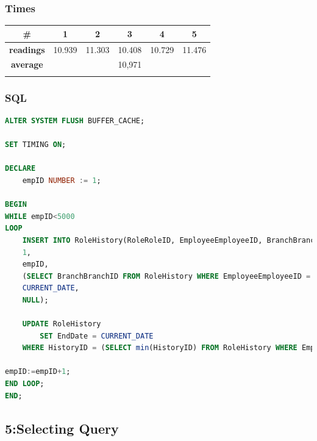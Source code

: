 \documentclass[a4paper, 10pt]{article}
\begin{document}
\subsubsection{Times}
\begin{table}[H]
\centering
\begin{tabular}{cccccc}
\hline
\multicolumn{1}{|c|}{\textbf{\#}}       & \multicolumn{1}{c|}{\textbf{1}} & \multicolumn{1}{c|}{\textbf{2}} & \multicolumn{1}{c|}{\textbf{3}} & \multicolumn{1}{c|}{\textbf{4}} & \multicolumn{1}{c|}{\textbf{5}} \\ \hline
\multicolumn{1}{|c|}{\textbf{readings}} & \multicolumn{1}{c|}{10.939}           & \multicolumn{1}{c|}{11.303}           & \multicolumn{1}{c|}{10.408}           & \multicolumn{1}{c|}{10.729}           & \multicolumn{1}{c|}{11.476}           \\ \hline
\multicolumn{1}{|c|}{\textbf{average}}      & \multicolumn{5}{c|}{10,971}                                                                                                                                                   \\ \hline
\textbf{}                               & \textbf{}                       & \textbf{}                       & \textbf{}                       & \textbf{}                       & \textbf{}                      
\end{tabular}
\end{table}
\subsubsection{SQL}
\begin{lstlisting}[language=SQL]
ALTER SYSTEM FLUSH BUFFER_CACHE;

SET TIMING ON;

DECLARE 
    empID NUMBER := 1;

BEGIN
WHILE empID<5000
LOOP
    INSERT INTO RoleHistory(RoleRoleID, EmployeeEmployeeID, BranchBranchId, BeginDate, EndDate) VALUES (
    1,
    empID,
    (SELECT BranchBranchID FROM RoleHistory WHERE EmployeeEmployeeID = empID AND EndDate is NULL),
    CURRENT_DATE,
    NULL);

    UPDATE RoleHistory
        SET EndDate = CURRENT_DATE
    WHERE HistoryID = (SELECT min(HistoryID) FROM RoleHistory WHERE EmployeeEmployeeID = empID AND EndDate is NULL);

empID:=empID+1;
END LOOP;
END;
\end{lstlisting}

\subsection{5:Selecting Query}
\end{document}
